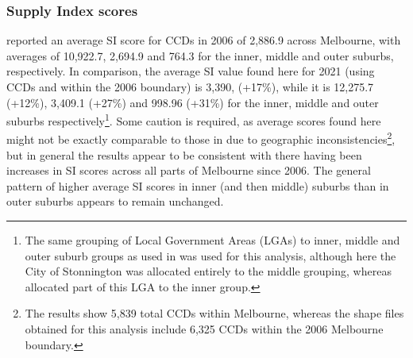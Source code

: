 \documentclass[preprint, 3p,
authoryear]{elsarticle} %
\begin{document}
\subsubsection{Supply Index scores}\label{supply-index-scores}

\citet{currie2010identifying} reported an average SI score for CCDs in
2006 of 2,886.9 across Melbourne, with averages of 10,922.7, 2,694.9 and
764.3 for the inner, middle and outer suburbs, respectively. In
comparison, the average SI value found here for 2021 (using CCDs and
within the 2006 boundary) is 3,390, (+17\%), while it is 12,275.7
(+12\%), 3,409.1 (+27\%) and 998.96 (+31\%) for the inner, middle and
outer suburbs respectively\footnote{The same grouping of Local
  Government Areas (LGAs) to inner, middle and outer suburb groups as
  used in \citet{currie2010identifying} was used for this analysis,
  although here the City of Stonnington was allocated entirely to the
  middle grouping, whereas \citet{currie2010identifying} allocated part
  of this LGA to the inner group.}. Some caution is required, as average
scores found here might not be exactly comparable to those in
\citet{currie2010identifying} due to geographic
inconsistencies\footnote{The \citet{currie2010identifying} results show
  5,839 total CCDs within Melbourne, whereas the shape files obtained
  for this analysis include 6,325 CCDs within the 2006 Melbourne
  boundary.}, but in general the results appear to be consistent with
there having been increases in SI scores across all parts of Melbourne
since 2006. The general pattern of higher average SI scores in inner
(and then middle) suburbs than in outer suburbs appears to remain
unchanged.
\end{document}
